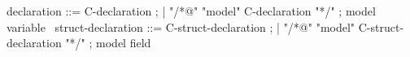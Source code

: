 \begin{syntax}
  declaration ::= C-declaration ;
  | "/*@" "model" C-declaration "*/" ; model variable
  \
  struct-declaration ::= C-struct-declaration ;
  | "/*@" "model" C-struct-declaration "*/" ; model field
\end{syntax}

